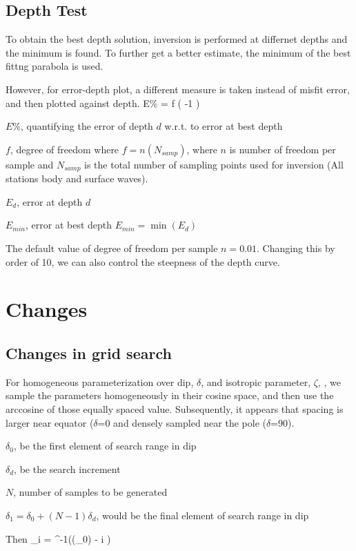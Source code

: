 \documentclass[11pt,titlepage,fleqn]{article}
\newcommand{\bdes}{\begin{description}}
\newcommand{\edes}{\end{description}}
\begin{document}
\subsection{Depth Test}
To obtain the best depth solution, inversion is performed at differnet depths and the minimum is found. To further get a better estimate, the minimum of the best fittng parabola is used.

However, for error-depth plot, a different measure is taken instead of misfit error, and then plotted against depth.
\eq
E\% = f \times \left (  -1 \right )
\en
\bdes
\item $E\%$, quantifying the error of depth $d$ w.r.t. to error at best depth
\item $f$, degree of freedom where $f = n (N_{samp})$, where $n$ is number of freedom per sample and $N_{samp}$ is the total number of sampling points used for inversion (All stations body and surface waves). 
\item $E_d$, error at depth $d$ 
\item $E_{min}$, error at best depth $E_{min} = \min(E_d)$
\edes
The default value of degree of freedom per sample $n =0.01$. Changing this by order of 10, we can also control the steepness of the depth curve.

\section{Changes}
\subsection{Changes in grid search}
For homogeneous parameterization over dip, $\delta$, and isotropic parameter, $\zeta$, \citep{TapeTape2012a_beach}, we sample the parameters homogeneously in their cosine space, and then use the arccosine of those equally spaced value. Subsequently, it appears that spacing is larger near equator ($\delta$=0 and densely sampled near the pole ($\delta$=90).

\bdes
\item $\delta_0$, be the first element of search range in dip
\item $\delta_d$, be the search increment
\item $N$, number of samples to be generated
\item $\delta_1 = \delta_0 + (N-1)\delta_d$, would be the final element of search range in dip
\edes

Then
\eq
\delta_i = \cos^{-1}\left ({\cos(\delta_0)} - i  \right)
\en
\end{document}
